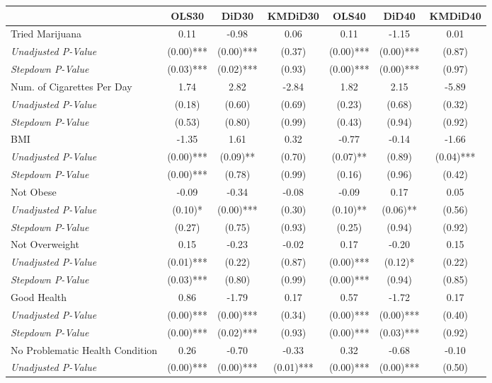 \begin{tabular}{l c c c c c c}
\toprule
 & OLS30 & DiD30 & KMDiD30 & OLS40 & DiD40 & KMDiD40 \\
\midrule
Tried Marijuana & 0.11 & -0.98 & 0.06 & 0.11 & -1.15 & 0.01 \\
\quad \textit{Unadjusted P-Value} & (0.00)*** & (0.00)*** & (0.37) & (0.00)*** & (0.00)*** & (0.87) \\
\quad \textit{Stepdown P-Value} & (0.03)*** & (0.02)*** & (0.93) & (0.00)*** & (0.00)*** & (0.97) \\
Num. of Cigarettes Per Day & 1.74 & 2.82 & -2.84 & 1.82 & 2.15 & -5.89 \\
\quad \textit{Unadjusted P-Value} & (0.18) & (0.60) & (0.69) & (0.23) & (0.68) & (0.32) \\
\quad \textit{Stepdown P-Value} & (0.53) & (0.80) & (0.99) & (0.43) & (0.94) & (0.92) \\
BMI & -1.35 & 1.61 & 0.32 & -0.77 & -0.14 & -1.66 \\
\quad \textit{Unadjusted P-Value} & (0.00)*** & (0.09)** & (0.70) & (0.07)** & (0.89) & (0.04)*** \\
\quad \textit{Stepdown P-Value} & (0.00)*** & (0.78) & (0.99) & (0.16) & (0.96) & (0.42) \\
Not Obese & -0.09 & -0.34 & -0.08 & -0.09 & 0.17 & 0.05 \\
\quad \textit{Unadjusted P-Value} & (0.10)* & (0.00)*** & (0.30) & (0.10)** & (0.06)** & (0.56) \\
\quad \textit{Stepdown P-Value} & (0.27) & (0.75) & (0.93) & (0.25) & (0.94) & (0.92) \\
Not Overweight & 0.15 & -0.23 & -0.02 & 0.17 & -0.20 & 0.15 \\
\quad \textit{Unadjusted P-Value} & (0.01)*** & (0.22) & (0.87) & (0.00)*** & (0.12)* & (0.22) \\
\quad \textit{Stepdown P-Value} & (0.03)*** & (0.80) & (0.99) & (0.00)*** & (0.94) & (0.85) \\
Good Health & 0.86 & -1.79 & 0.17 & 0.57 & -1.72 & 0.17 \\
\quad \textit{Unadjusted P-Value} & (0.00)*** & (0.00)*** & (0.34) & (0.00)*** & (0.00)*** & (0.40) \\
\quad \textit{Stepdown P-Value} & (0.00)*** & (0.02)*** & (0.93) & (0.00)*** & (0.03)*** & (0.92) \\
No Problematic Health Condition & 0.26 & -0.70 & -0.33 & 0.32 & -0.68 & -0.10 \\
\quad \textit{Unadjusted P-Value} & (0.00)*** & (0.00)*** & (0.01)*** & (0.00)*** & (0.00)*** & (0.50) \\

\end{tabular}
